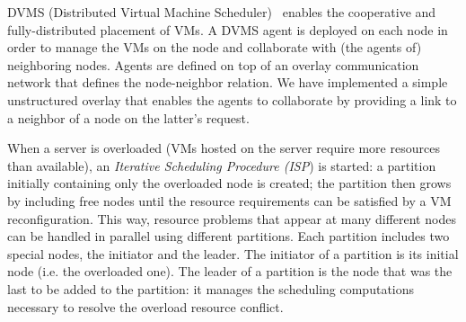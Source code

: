 DVMS (Distributed Virtual Machine Scheduler)~\cite{quesnel:cpe2012} enables the
cooperative and fully-distributed placement of
VMs.
%
%
%
%
%
A DVMS agent is deployed on each node in order to manage the VMs on
the node and collaborate with (the agents of) neighboring nodes.
Agents are defined on top of an overlay communication network that
defines the node-neighbor relation.
We have implemented a simple %
unstructured overlay that enables the agents to collaborate
by providing a link to a neighbor of a node on the latter's request.

When a server is overloaded (\ie VMs hosted on the server require more
resources than available), an \emph{Iterative Scheduling Procedure
  (ISP}) is started: a partition initially containing only the
overloaded node is created; the partition then grows by including free
nodes until the resource requirements can be satisfied by a VM
reconfiguration. This way, resource problems that appear at many
different nodes can be handled in parallel using different
partitions.
%
Each partition includes two special nodes, the initiator and the
leader.  The initiator of a partition is its initial node (i.e. the
overloaded one).  The leader of a partition is the node that was the
last to be added to the partition: it manages the scheduling
computations necessary to resolve the overload resource conflict.

